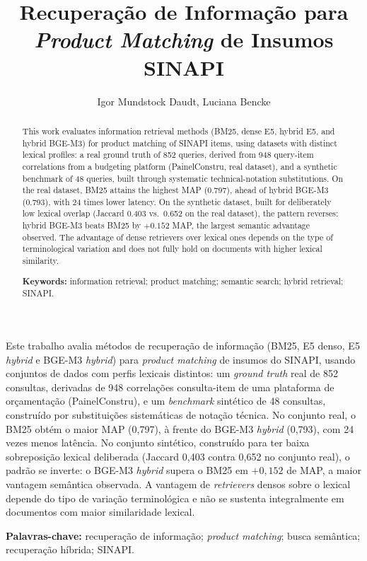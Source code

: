 \documentclass[12pt]{article}
\title{Recupera\c{c}\~ao de Informa\c{c}\~ao para \emph{Product Matching} de Insumos SINAPI}
\author{Igor Mundstock Daudt\inst{1}, Luciana Bencke\inst{1}}
\begin{document}
\maketitle

\begin{abstract}
This work evaluates information retrieval methods (BM25, dense E5, hybrid E5, and hybrid BGE-M3) for product matching of SINAPI items, using datasets with distinct lexical profiles: a real ground truth of 852 queries, derived from 948 query-item correlations from a budgeting platform (PainelConstru, real dataset), and a synthetic benchmark of 48 queries, built through systematic technical-notation substitutions. On the real dataset, BM25 attains the highest MAP (0.797), ahead of hybrid BGE-M3 (0.793), with 24 times lower latency. On the synthetic dataset, built for deliberately low lexical overlap (Jaccard 0.403 vs.\ 0.652 on the real dataset), the pattern reverses: hybrid BGE-M3 beats BM25 by $+0.152$ MAP, the largest semantic advantage observed. The advantage of dense retrievers over lexical ones depends on the type of terminological variation and does not fully hold on documents with higher lexical similarity.

\smallskip
\noindent\textbf{Keywords:} information retrieval; product matching; semantic search; hybrid retrieval; SINAPI.
\end{abstract}

\begin{resumo}
Este trabalho avalia m\'etodos de recupera\c{c}\~ao de informa\c{c}\~ao (BM25, E5 denso, E5 \emph{hybrid} e BGE-M3 \emph{hybrid}) para \emph{product matching} de insumos do SINAPI, usando conjuntos de dados com perfis lexicais distintos: um \emph{ground truth} real de 852 consultas, derivadas de 948 correla\c{c}\~oes consulta-item de uma plataforma de or\c{c}amenta\c{c}\~ao (PainelConstru), e um \emph{benchmark} sint\'etico de 48 consultas, constru\'ido por substitui\c{c}\~oes sistem\'aticas de nota\c{c}\~ao t\'ecnica. No conjunto real, o BM25 obt\'em o maior MAP (0,797), \`a frente do BGE-M3 \emph{hybrid} (0,793), com 24 vezes menos lat\^encia. No conjunto sint\'etico, constru\'ido para ter baixa sobreposi\c{c}\~ao lexical deliberada (Jaccard 0,403 contra 0,652 no conjunto real), o padr\~ao se inverte: o BGE-M3 \emph{hybrid} supera o BM25 em $+0{,}152$ de MAP, a maior vantagem sem\^antica observada. A vantagem de \emph{retrievers} densos sobre o lexical depende do tipo de varia\c{c}\~ao terminol\'ogica e n\~ao se sustenta integralmente em documentos com maior similaridade lexical.

\smallskip
\noindent\textbf{Palavras-chave:} recupera\c{c}\~ao de informa\c{c}\~ao; \emph{product matching}; busca sem\^antica; recupera\c{c}\~ao h\'ibrida; SINAPI.
\end{resumo}
\end{document}
